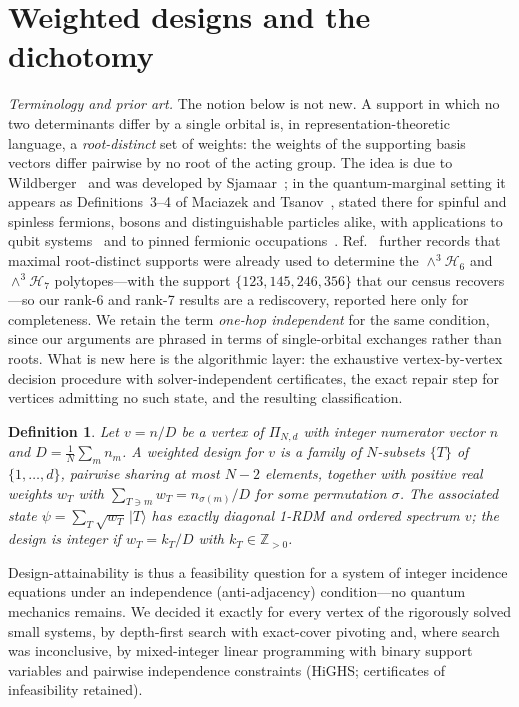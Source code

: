\documentclass[11pt]{article}
\newtheorem{definition}{Definition}
\newcommand{\ket}[1]{|#1\rangle}
\begin{document}
\section{Weighted designs and the dichotomy}

\emph{Terminology and prior art.} The notion below is not new. A support in
which no two determinants differ by a single orbital is, in
representation-theoretic language, a \emph{root-distinct} set of weights: the
weights of the supporting basis vectors differ pairwise by no root of the
acting group. The idea is due to Wildberger~\cite{W92} and was developed by
Sjamaar~\cite{S98}; in the quantum-marginal setting it appears as
Definitions~3--4 of Maciazek and Tsanov~\cite{MT17}, stated there for spinful
and spinless fermions, bosons and distinguishable particles alike, with
applications to qubit systems~\cite{M15} and to pinned fermionic
occupations~\cite{MS20}. Ref.~\cite{MT17} further records that maximal
root-distinct supports were already used to determine the
$\wedge^3\mathcal{H}_6$ and $\wedge^3\mathcal{H}_7$ polytopes---with the
support $\{123,145,246,356\}$ that our census recovers---so our rank-6 and
rank-7 results are a rediscovery, reported here only for completeness. We
retain the term \emph{one-hop independent} for the same condition, since our
arguments are phrased in terms of single-orbital exchanges rather than roots.
What is new here is the algorithmic layer: the exhaustive vertex-by-vertex
decision procedure with solver-independent certificates, the exact repair step
for vertices admitting no such state, and the resulting classification.

\label{sec:census}

\begin{definition}
\label{def:design}
Let $v = n/D$ be a vertex of $\Pi_{N,d}$ with integer numerator vector $n$
and $D = \tfrac1N\sum_m n_m$. A \emph{weighted design} for $v$ is a family
of $N$-subsets $\{T\}$ of $\{1,\dots,d\}$, pairwise sharing at most $N-2$
elements, together with positive real weights $w_T$ with
$\sum_{T\ni m} w_T = n_{\sigma(m)}/D$ for some permutation $\sigma$. The
associated state $\psi = \sum_T \sqrt{w_T}\,\ket{T}$ has exactly diagonal
1-RDM and ordered spectrum $v$; the design is \emph{integer} if
$w_T = k_T/D$ with $k_T \in \mathbb{Z}_{>0}$.
\end{definition}

Design-attainability is thus a feasibility question for a system of integer
incidence equations under an independence (anti-adjacency) condition---no
quantum mechanics remains. We decided it exactly for every vertex of the
rigorously solved small systems, by depth-first search with exact-cover
pivoting and, where search was inconclusive, by mixed-integer linear
programming with binary support variables and pairwise independence
constraints (HiGHS; certificates of infeasibility retained).
\end{document}
